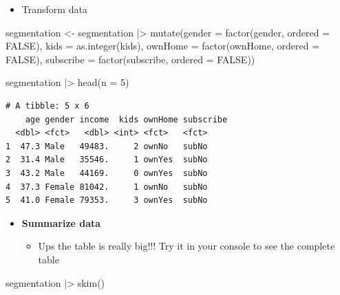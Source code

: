 \documentclass[
  ignorenonframetext,
]{beamer}
\newenvironment{Shaded}{\begin{snugshade}}{\end{snugshade}}
\newcommand{\AttributeTok}[1]{\textcolor[rgb]{0.40,0.45,0.13}{#1}}
\newcommand{\ConstantTok}[1]{\textcolor[rgb]{0.56,0.35,0.01}{#1}}
\newcommand{\DecValTok}[1]{\textcolor[rgb]{0.68,0.00,0.00}{#1}}
\newcommand{\FunctionTok}[1]{\textcolor[rgb]{0.28,0.35,0.67}{#1}}
\newcommand{\NormalTok}[1]{\textcolor[rgb]{0.00,0.23,0.31}{#1}}
\newcommand{\OtherTok}[1]{\textcolor[rgb]{0.00,0.23,0.31}{#1}}
\newcommand{\SpecialCharTok}[1]{\textcolor[rgb]{0.37,0.37,0.37}{#1}}
\providecommand{\tightlist}{%
  \setlength{\itemsep}{0pt}\setlength{\parskip}{0pt}}\usepackage{longtable,booktabs,array}
\begin{document}
\begin{frame}[fragile]{}
\label{section-5}
\begin{itemize}
\tightlist
\item
  Transform data
\end{itemize}

\tiny

\begin{Shaded}
\begin{Highlighting}[]
\NormalTok{segmentation }\OtherTok{\textless{}{-}}\NormalTok{ segmentation }\SpecialCharTok{|\textgreater{}}
  \FunctionTok{mutate}\NormalTok{(}\AttributeTok{gender =} \FunctionTok{factor}\NormalTok{(gender, }\AttributeTok{ordered =} \ConstantTok{FALSE}\NormalTok{),}
         \AttributeTok{kids =} \FunctionTok{as.integer}\NormalTok{(kids),}
         \AttributeTok{ownHome =} \FunctionTok{factor}\NormalTok{(ownHome, }\AttributeTok{ordered =} \ConstantTok{FALSE}\NormalTok{),}
         \AttributeTok{subscribe =} \FunctionTok{factor}\NormalTok{(subscribe, }\AttributeTok{ordered =} \ConstantTok{FALSE}\NormalTok{))}

\NormalTok{segmentation }\SpecialCharTok{|\textgreater{}} \FunctionTok{head}\NormalTok{(}\AttributeTok{n =} \DecValTok{5}\NormalTok{)}
\end{Highlighting}
\end{Shaded}

\begin{verbatim}
# A tibble: 5 x 6
    age gender income  kids ownHome subscribe
  <dbl> <fct>   <dbl> <int> <fct>   <fct>    
1  47.3 Male   49483.     2 ownNo   subNo    
2  31.4 Male   35546.     1 ownYes  subNo    
3  43.2 Male   44169.     0 ownYes  subNo    
4  37.3 Female 81042.     1 ownNo   subNo    
5  41.0 Female 79353.     3 ownYes  subNo    
\end{verbatim}
\end{frame}

\begin{frame}[fragile]{}
\label{section-6}
\begin{itemize}
\item
  \textbf{Summarize data}

  \begin{itemize}
  \tightlist
  \item
    Ups the table is really big!!! Try it in your console to see the
    complete table
  \end{itemize}
\end{itemize}

\tiny

\begin{Shaded}
\begin{Highlighting}[]
\NormalTok{segmentation }\SpecialCharTok{|\textgreater{}} \FunctionTok{skim}\NormalTok{()}
\end{Highlighting}
\end{Shaded}
\end{frame}
\end{document}
